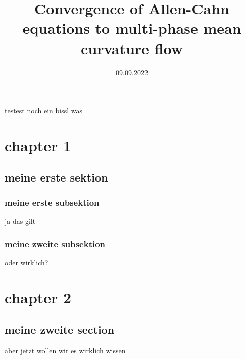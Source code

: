 \documentclass[a4paper, 10pt, bibliogrpahy = totocnumbered]{scrbook}
\date{09.09.2022}
\title{Convergence of Allen-Cahn equations to multi-phase mean curvature flow}
\begin{document}
	
\frontmatter	

	\maketitle
	\tableofcontents
	
\mainmatter	
	testest noch ein bissl was
	
	
	
	\chapter{chapter 1}
	\section{meine erste sektion}
	
	\subsection{meine erste subsektion}
	\begin{theorem}
		ja das gilt
	\end{theorem}

	\subsection{meine zweite subsektion}
	
	\begin{lemma}
		oder wirklich?
	\end{lemma}
	
	\chapter{chapter 2}
	
	\section{meine zweite section}
	
	\begin{definition}
		aber jetzt wollen wir es wirklich wissen
	\end{definition}
\appendix

\backmatter

	
\end{document}
